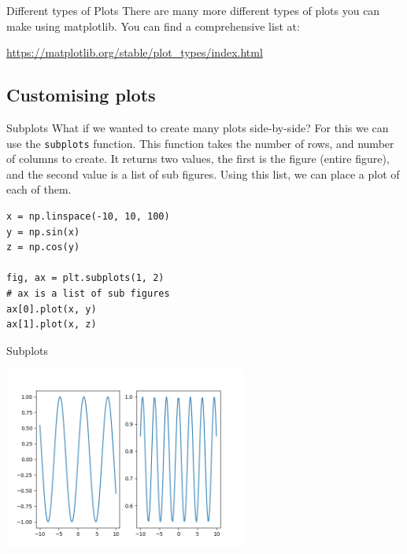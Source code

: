 \documentclass[10pt]{beamer}
\begin{document}
\begin{frame}[label={sec:org94c7f0b}]{Different types of Plots}
There are many more different types of plots you can make using matplotlib. You
can find a comprehensive list at:

\url{https://matplotlib.org/stable/plot\_types/index.html}
\end{frame}

\subsection{Customising plots}
\label{sec:org850df69}

\begin{frame}[label={sec:org2c28358},fragile]{Subplots}
 What if we wanted to create many plots side-by-side? For this we can use the
\texttt{subplots} function. This function takes the number of rows, and number of columns
to create. It returns two values, the first is the figure (entire figure), and
the second value is a list of sub figures. Using this list, we can place a plot
of each of them.

\begin{verbatim}
x = np.linspace(-10, 10, 100)
y = np.sin(x)
z = np.cos(y)

fig, ax = plt.subplots(1, 2)
# ax is a list of sub figures
ax[0].plot(x, y)
ax[1].plot(x, z)
\end{verbatim}
\end{frame}

\begin{frame}[label={sec:org01aeafa}]{Subplots}
\begin{center}
\includegraphics[width=0.6\textwidth]{images/subplots.png}
\end{center}
\end{frame}
\end{document}
